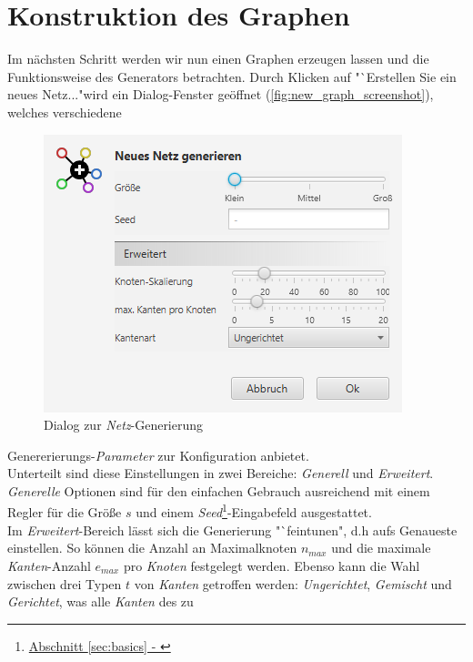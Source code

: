 \documentclass[12pt]{article}
\begin{document}
\section{Konstruktion des Graphen}
\label{sec:construct}
Im nächsten Schritt werden wir nun einen Graphen erzeugen lassen und die Funktionsweise des Generators betrachten. 
Durch Klicken auf "`Erstellen Sie ein neues Netz..."\;wird ein Dialog-Fenster geöffnet (\autoref{fig:new_graph_screenshot}), welches verschiedene 
\begin{figure}
\vspace{-20pt}
\begin{center}
\includegraphics[scale=0.6]{res/new_graph_screenshot.png}
\end{center}
\vspace{-20pt}
\centering
\caption{Dialog zur \textit{Netz}-Generierung}
\label{fig:new_graph_screenshot}
\end{figure}
Genererierungs-\textit{Parameter} zur Konfiguration anbietet. 
\\
Unterteilt sind diese Einstellungen in zwei Bereiche: \textit{Generell} und \textit{Erweitert}. \textit{Generelle} Optionen sind für den einfachen Gebrauch ausreichend mit einem Regler für die Größe $s$ und einem 
\textit{Seed}\footnote{\hyperref[sec:basics]{Abschnitt \ref*{sec:basics} - }}-Eingabefeld ausgestattet.
\\
Im \textit{Erweitert}-Bereich lässt sich die Generierung "`feintunen", d.h aufs Genaueste einstellen. So können die Anzahl an Maximalknoten $n_{max}$ und die maximale \textit{Kanten}-Anzahl $e_{max}$ pro \textit{Knoten} 
festgelegt werden. Ebenso kann die Wahl zwischen drei Typen $t$ von \textit{Kanten} getroffen werden: \textit{Ungerichtet}, \textit{Gemischt} und \textit{Gerichtet}\footnotemark[1], was alle \textit{Kanten} des zu 
\end{document}
